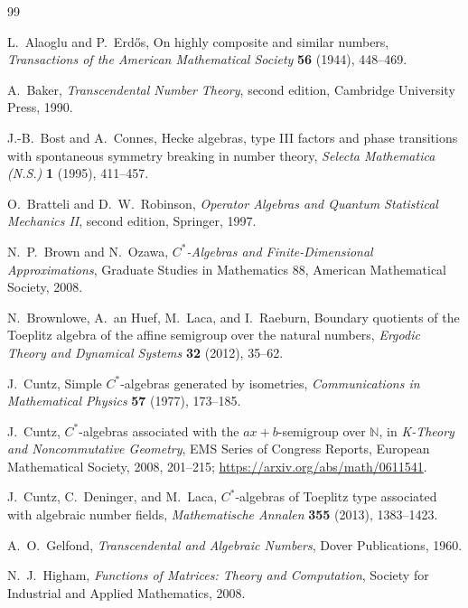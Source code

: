 \documentclass[11pt,oneside]{article}
\theoremstyle{definition}
\theoremstyle{remark}
\newcommand{\N}{\mathbb N}
\begin{document}
\begin{thebibliography}{99}

L.~Alaoglu and P.~Erd\H{o}s,
\newblock On highly composite and similar numbers,
\newblock \emph{Transactions of the American Mathematical Society}
  \textbf{56} (1944), 448--469.

A.~Baker,
\newblock \emph{Transcendental Number Theory},
\newblock second edition, Cambridge University Press, 1990.

J.-B.~Bost and A.~Connes,
\newblock Hecke algebras, type III factors and phase transitions with
spontaneous symmetry breaking in number theory,
\newblock \emph{Selecta Mathematica (N.S.)} \textbf{1} (1995), 411--457.

O.~Bratteli and D.~W.~Robinson,
\newblock \emph{Operator Algebras and Quantum Statistical Mechanics II},
\newblock second edition, Springer, 1997.

N.~P.~Brown and N.~Ozawa,
\newblock \emph{\(C^*\)-Algebras and Finite-Dimensional Approximations},
\newblock Graduate Studies in Mathematics 88, American Mathematical
Society, 2008.

N.~Brownlowe, A.~an Huef, M.~Laca, and I.~Raeburn,
\newblock Boundary quotients of the Toeplitz algebra of the affine
semigroup over the natural numbers,
\newblock \emph{Ergodic Theory and Dynamical Systems} \textbf{32} (2012),
35--62.

J.~Cuntz,
\newblock Simple \(C^*\)-algebras generated by isometries,
\newblock \emph{Communications in Mathematical Physics} \textbf{57}
(1977), 173--185.

J.~Cuntz,
\newblock \(C^*\)-algebras associated with the \(ax+b\)-semigroup over
\(\N\),
\newblock in \emph{K-Theory and Noncommutative Geometry}, EMS Series of
Congress Reports, European Mathematical Society, 2008, 201--215;
\newblock \url{https://arxiv.org/abs/math/0611541}.

J.~Cuntz, C.~Deninger, and M.~Laca,
\newblock \(C^*\)-algebras of Toeplitz type associated with algebraic
number fields,
\newblock \emph{Mathematische Annalen} \textbf{355} (2013), 1383--1423.

A.~O.~Gelfond,
\newblock \emph{Transcendental and Algebraic Numbers},
\newblock Dover Publications, 1960.

N.~J.~Higham,
\newblock \emph{Functions of Matrices: Theory and Computation},
\newblock Society for Industrial and Applied Mathematics, 2008.


\end{thebibliography}
\end{document}
